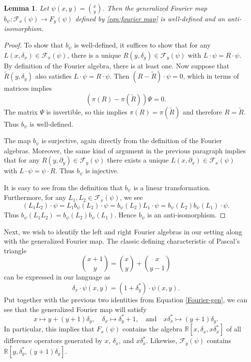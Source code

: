 \documentclass[11pt]{amsart}
\theoremstyle{plain}
\newtheorem{lemma}[theorem]{Lemma}
\theoremstyle{named}
\def \wt {\widetilde}
\begin{document}
\begin{lemma}
Let $\psi(x,y) = \binom{x}{y}$.
Then the generalized Fourier map $b_\psi: \mathcal F_x(\psi)\rightarrow F_y(\psi)$ defined by \eqref{eqn:fourier map} is well-defined and an anti-isomorphism.
\end{lemma}
\begin{proof}
To show that $b_\psi$ is well-defined, it suffices to show that for any $L(x,\delta_x)\in\mathcal F_x(\psi)$, there is a unique $R(y,\delta_y)\in\mathcal F_y(\psi)$ with $L\cdot\psi = R\cdot\psi$.
By definition of the Fourier algebra, there is at least one.
Now suppose that $\wt R(y,\delta_y)$ also satisfies $L\cdot\psi = R\cdot\psi$.
Then $(R-\wt R)\cdot\psi = 0$, which in terms of matrices implies
$$(\pi(R)-\pi(\wt R))\Psi = 0.$$
The matrix $\Psi$ is invertible, so this implies $\pi(R) = \pi(\wt R)$ and therefore $R = \wt R$.
Thus $b_\psi$ is well-defined.

The map $b_\psi$ is surjective, again directly from the definition of the Fourier algebras.
Moreover, the same kind of argument in the previous paragraph implies that for any $R(y,\partial_y)\in\mathcal F_y(\psi)$ there exists a unique $L(x,\partial_x)\in \mathcal F_x(\psi)$ with $L\cdot\psi = \psi\cdot R$.  Thus $b_\psi$ is injective.

It is easy to see from the definition that $b_\psi$ is a linear transformation.
Furthermore, for any $L_1,L_2\in\mathcal F_x(\psi)$, we see
$$(L_1L_2)\cdot\psi = L_1 b_\psi(L_2)\cdot\psi = b_\psi(L_2)L_1\cdot\psi = b_\psi(L_2)b_\psi(L_1)\cdot\psi.$$
Thus $b_\psi(L_1L_2) = b_\psi(L_2)b_\psi(L_1)$.
Hence $b_\psi$ is an anti-isomorphism.
\end{proof}


Next, we wish to identify the left and right Fourier algebras in our setting along with the generalized Fourier map.
The classic defining characteristic of Pascal's triangle
$$\binom{x+1}{y} = \binom{x}{y}+\binom{x}{y-1}$$
can be expressed in our language as
$$\delta_x\cdot\psi(x,y) = (1 + \delta_y^*)\cdot\psi(x,y).$$
Put together with the previous two identities from Equation \eqref{Fourier-gen}, we can see that the generalized Fourier map will satisfy
\begin{equation}\label{Fourier-gen}
    x\mapsto y + (y+1)\delta_y,\quad \delta_x\mapsto\delta_y^*+1,\quad \text{and}\quad  x\delta_x^*\mapsto(y+1)\delta_y.
\end{equation}
In particular, this implies that $F_x(\psi)$ contains the algebra $\mathbb R[x,\delta_x,x\delta_x^*]$ of all difference operators generated by $x$, $\delta_x$, and $x\delta_x^*$.  Likewise, $\mathcal F_y(\psi)$ contains $\mathbb R[y,\delta_y^*,(y+1)\delta_y]$.
\end{document}
